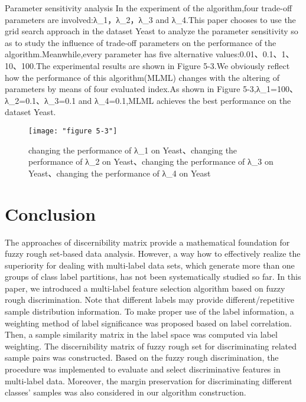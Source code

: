 \documentclass[final,3p,times]{elsarticle}
\begin{document}
Parameter sensitivity analysis
     In the experiment of the algorithm,four trade-off parameters are involved:{λ}_{1}，{λ}_{2}，{λ}_{3} and {λ}_{4}.This paper chooses to use the grid search approach in the dataset Yeast to analyze the parameter sensitivity so as to study the influence of trade-off parameters on the performance of the algorithm.Meanwhile,every parameter has five alternative values:0.01、0.1、1、10、100.The experimental results are shown in Figure 5-3.We obviously reflect how the performance of this algorithm(MLML) changes with the altering of parameters by means of four evaluated index.As shown in Figure 5-3,{λ}_{1}=100、{λ}_{2}=0.1、{λ}_{3}=0.1 and {λ}_{4}=0.1,MLML achieves the best performance on the dataset Yeast.
     	          \begin{figure}
     	          	\centering
     	          	\texttt{[image: "figure 5-3"]}
     	          	\caption{changing the performance of {λ}_{1} on Yeast、changing the performance of {λ}_{2} on Yeast、changing the performance of {λ}_{3} on Yeast、changing the performance of {λ}_{4} on Yeast}
     	          \end{figure}
     	          
\section{Conclusion}
The approaches of discernibility matrix provide a mathematical foundation for fuzzy rough set-based data analysis. However,  a way how to
effectively realize the superiority for dealing with multi-label data sets, which generate more than one groups of class label partitions, has not been systematically studied so far.
In this paper, we introduced  a multi-label feature selection algorithm based on fuzzy rough discrimination. Note that different labels may provide different/repetitive sample distribution information. To make proper use of the label information, a weighting method of label significance was proposed based on label correlation. Then, a sample similarity matrix in the label space was computed via label weighting.
The discernibility matrix of fuzzy rough set for discriminating related sample pairs was constructed.  Based on the fuzzy rough discrimination, the procedure was implemented to evaluate and select
discriminative features in multi-label data. Moreover, the margin preservation for discriminating different classes' samples was also considered in our algorithm construction.
\end{document}
